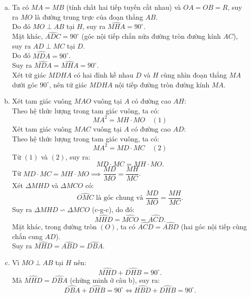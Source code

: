 \begin{bt}
{\begin{center}
	\end{center}
	\begin{enumerate}[a)]
		\item Ta có $MA = MB$ (tính chất hai tiếp tuyến cắt nhau) và $OA = OB = R$, suy ra $MO$ là đường trung trực của đoạn thẳng $AB$.\\
		Do đó $MO \perp AB$ tại $H$, suy ra $\widehat{MHA} = 90^\circ$.\\
		Mặt khác, $\widehat{ADC} = 90^\circ$ (góc nội tiếp chắn nửa đường tròn đường kính $AC$), suy ra $AD \perp MC$ tại $D$.\\
		Do đó $\widehat{MDA} = 90^\circ$.\\
		Suy ra $\widehat{MDA} = \widehat{MHA} = 90^\circ$.\\
		Xét tứ giác $MDHA$ có hai đỉnh kề nhau $D$ và $H$ cùng nhìn đoạn thẳng $MA$ dưới góc $90^\circ$, nên tứ giác $MDHA$ nội tiếp đường tròn đường kính $MA$.
		\item Xét tam giác vuông $MAO$ vuông tại $A$ có đường cao $AH$:\\
		Theo hệ thức lượng trong tam giác vuông, ta có:
		$$MA^2 = MH \cdot MO \quad (1)$$
		Xét tam giác vuông $MAC$ vuông tại $A$ có đường cao $AD$:\\
		Theo hệ thức lượng trong tam giác vuông, ta có:
		$$MA^2 = MD \cdot MC \quad (2)$$
		Từ $(1)$ và $(2)$, suy ra:
		$$MD \cdot MC = MH \cdot MO.$$
		Từ $MD \cdot MC = MH \cdot MO \implies \dfrac{MD}{MO} = \dfrac{MH}{MC}$.\\
		Xét $\Delta MHD$ và $\Delta MCO$ có:
		$$\widehat{OMC}\text{ là góc chung và } \frac{MD}{MO} = \frac{MH}{MC}.$$
		Suy ra $\Delta MHD \backsim \Delta MCO$ (c-g-c), do đó:
		$$\widehat{MHD} = \widehat{MCO} = \widehat{ACD}.$$
		Mặt khác, trong đường tròn $(O)$, ta có $\widehat{ACD} = \widehat{ABD}$ (hai góc nội tiếp cùng chắn cung $AD$).\\
		Suy ra $\widehat{MHD} = \widehat{ABD} = \widehat{DBA}$.
		\item Vì $MO \perp AB$ tại $H$ nên:
		$$\widehat{MHD} + \widehat{DHB} = 90^\circ.$$
		Mà $\widehat{MHD} = \widehat{DBA}$ (chứng minh ở câu b), suy ra:
		$$\widehat{DBA} + \widehat{DHB} = 90^\circ \iff \widehat{HBD} + \widehat{DHB} = 90^\circ.$$

\end{enumerate}}
\end{bt}
